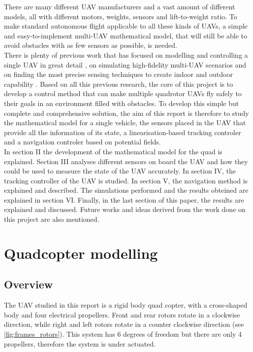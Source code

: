 \documentclass[journal]{IEEEtran}
\begin{document}
	There are many different UAV manufacturers and a vast amount of different models, all with different motors, weights, sensors and lift-to-weight ratio. To make standard autonomous flight applicable to all these kinds of UAVs, a simple and easy-to-implement multi-UAV mathematical model, that will still be able to avoid obstacles with as few sensors as possible, is needed.\\
	
	 There is plenty of previous work that has focused on modelling and controlling a single UAV in great detail \cite{intro_nolinear_model_control}, on simulating high-fidelity multi-UAV scenarios \cite{intro_3d_unity} and on finding the most precise sensing techniques to create indoor and outdoor capability \cite{intro_indoor_sensing}. Based on all this previous research, the core of this project is to develop a control method that can make multiple quadrotor UAVs fly safely to their goals in an environment filled with obstacles. To develop this simple but complete and comprehensive solution, the aim of this report is therefore to study the mathematical model for a single vehicle, the sensors placed in the UAV that provide all the information of its state, a linearisation-based tracking controler and a navigation controler based on potential fields. \\
	
	In section II the development of the mathematical model for the quad is explained. Section III analyses different sensors on board the UAV and how they could be used to measure the state of the UAV accurately. In section IV, the tracking controller of the UAV is studied. In section V, the navigation method  is explained and described. The simulations performed and the results obteined are explained in section VI. Finally, in the last section of this paper, the results are explained and discussed. Future works and ideas derived from the work done on this project are also mentioned.

	\hfill 	
	
	
	\section{Quadcopter modelling}
	\subsection{Overview}
	
	The UAV studied in this report is a rigid body quad copter, with a cross-shaped body and four electrical propellers. Front and rear rotors rotate in a clockwise direction, while right and left rotors rotate in a counter clockwise direction (see \figurename  \ref{fig:frames_rotors}). This system has 6 degrees of freedom but there are only 4 propellers, therefore the system is under actuated. 
	
\end{document}
